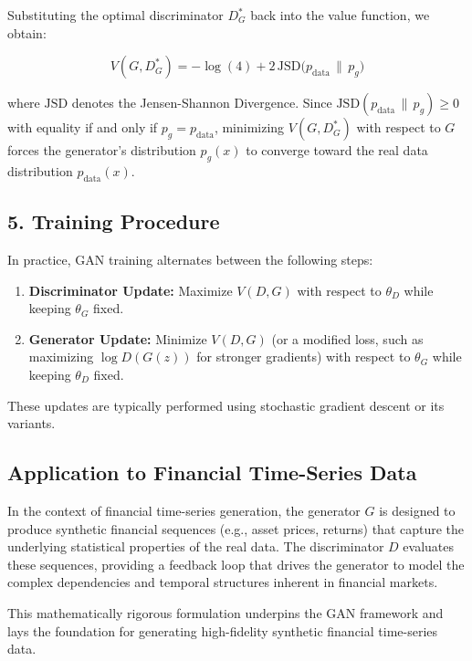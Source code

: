 \documentclass{article}
\begin{document}
Substituting the optimal discriminator $ D^*_G $ back into the value function, we obtain:

\begin{equation}
    V(G, D^*_G) = -\log(4) + 2\, \mathrm{JSD}\big(p_{\text{data}} \,\|\, p_g\big)
\end{equation}

where $ \mathrm{JSD} $ denotes the Jensen-Shannon Divergence. Since $ \mathrm{JSD}(p_{\text{data}} \,\|\, p_g) \geq 0 $ with equality if and only if $ p_g = p_{\text{data}} $, minimizing $ V(G, D^*_G) $ with respect to $ G $ forces the generator’s distribution $ p_g(x) $ to converge toward the real data distribution $ p_{\text{data}}(x) $.

\subsection*{5. Training Procedure}

In practice, GAN training alternates between the following steps:
\begin{enumerate}
    \item \textbf{Discriminator Update:}
    Maximize $ V(D, G) $ with respect to $ \theta_D $ while keeping $ \theta_G $ fixed.

    \item \textbf{Generator Update:}
    Minimize $ V(D, G) $ (or a modified loss, such as maximizing $ \log D(G(z)) $ for stronger gradients) with respect to $ \theta_G $ while keeping $ \theta_D $ fixed.
\end{enumerate}

These updates are typically performed using stochastic gradient descent or its variants.

\subsection*{Application to Financial Time-Series Data}

In the context of financial time-series generation, the generator $ G $ is designed to produce synthetic financial sequences (e.g., asset prices, returns) that capture the underlying statistical properties of the real data. The discriminator $ D $ evaluates these sequences, providing a feedback loop that drives the generator to model the complex dependencies and temporal structures inherent in financial markets.

This mathematically rigorous formulation underpins the GAN framework and lays the foundation for generating high-fidelity synthetic financial time-series data.
\end{document}
